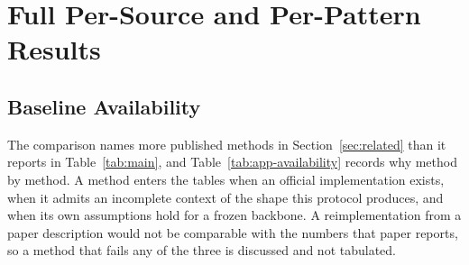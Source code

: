 \documentclass{article}
\begin{document}
\begin{table}[h]
  \caption{Governance contract by input regime. The complete-input rows are contract
  statements and not accuracy results. The expected behaviour there is a no-op, and a non-no-op
  would be a defect rather than an improvement.}
  \label{tab:app-complete}
  \centering
  \small
  \setlength{\tabcolsep}{4pt}
\end{table}


\section{Full Per-Source and Per-Pattern Results}
\label{app:full-results}
\subsection{Baseline Availability}
\label{app:baseline-availability}
The comparison names more published methods in Section~\ref{sec:related} than it reports in
Table~\ref{tab:main}, and Table~\ref{tab:app-availability} records why method by method. A
method enters the tables when an official implementation exists, when it admits an incomplete
context of the shape this protocol produces, and when its own assumptions hold for a frozen
backbone. A reimplementation from a paper description would not be comparable with the numbers
that paper reports, so a method that fails any of the three is discussed and not tabulated.
\end{document}
